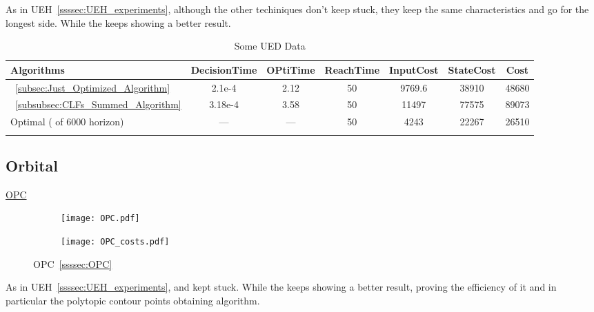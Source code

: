 As in UEH~\ref{ssssec:UEH_experiments}, although the other techiniques don't keep stuck, they keep the same characteristics and go for the longest side. While the  keeps showing a better result.


  \bgroup
 \begin{xltabular}{\textwidth}{|l|cccccc|}
   \toprule
   Algorithms   & DecisionTime & OPtiTime & ReachTime  & InputCost   & StateCost & Cost           \\
   \midrule
    ~\ref{subsec:Just_Optimized_Algorithm}           & 2.1e-4 & 2.12 & 50 & 9769.6 & 38910  & 48680 \\
    ~\ref{subsubsec:CLFs_Summed_Algorithm}        & 3.18e-4 & 3.58 & 50 & 11497 & 77575 & 89073  \\
    Optimal ( of 6000 horizon)                        & ---     & ---  & 50  & 4243 & 22267 & 26510 \\
    \midrule
    \caption{Some UED Data}
    \label{tab:Some_UED_Data}\\
   \end{xltabular}
 \egroup

 \newpage

\subsection{Orbital}
\label{subsec:orbital_experiments}

\underline{OPC}
\label{OPC_experiments} %

 \begin{figure}[htbp]
  \begin{subfigure}{0.5\textwidth}
    \centering
    \texttt{[image: OPC.pdf]}
  \label{fig:OPC_CostEvol}
  \end{subfigure}
  \begin{subfigure}{0.6\textwidth}
    \centering
    \texttt{[image: OPC\_costs.pdf]}
  \label{fig:OPC_trajectory}
  \end{subfigure}
  \caption{OPC~\ref{ssssec:OPC}}
\label{fig:OPCTrajectory_and_CostEvol}
\end{figure}


As in UEH~\ref{ssssec:UEH_experiments},  and   kept stuck. While the  keeps showing a better result, proving the efficiency of it and in particular the polytopic contour points obtaining algorithm. 


